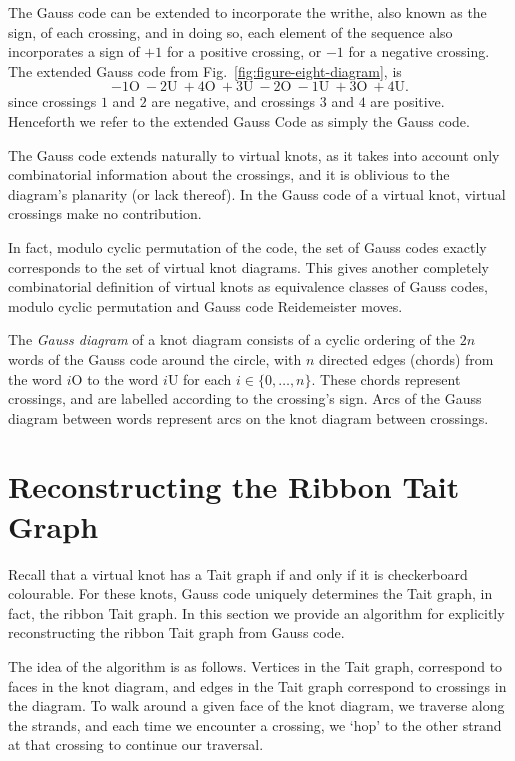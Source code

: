 \documentclass[12pt]{report}
\renewcommand{\over}{\text{O}}
\newcommand{\under}{\text{U}}
\theoremstyle{upright}
\begin{document}
The Gauss code can be extended to incorporate the writhe, also known as the sign, of each crossing, and in doing so, each element of the sequence also incorporates a sign of $+1$ for a positive crossing, or $-1$ for a negative crossing. The extended Gauss code from Fig.~\ref{fig:figure-eight-diagram}, is
\[-1\over\ -2\under\ +4\over\ +3\under\ -2\over\ -1\under\ +3\over\ +4\under.\]
since crossings $1$ and $2$ are negative, and crossings $3$ and $4$ are positive. Henceforth we refer to the extended Gauss Code as simply the Gauss code.

The Gauss code extends naturally to virtual knots, as it takes into account only combinatorial information about the crossings, and it is oblivious to the diagram's planarity (or lack thereof). In the Gauss code of a virtual knot, virtual crossings make no contribution. 

In fact, modulo cyclic permutation of the code, the set of Gauss codes exactly corresponds to the set of virtual knot diagrams. This gives another completely combinatorial definition of virtual knots as equivalence classes of Gauss codes, modulo cyclic permutation and Gauss code Reidemeister moves.

The \textit{Gauss diagram} of a knot diagram consists of a cyclic ordering of the $2n$ words of the Gauss code around the circle, with $n$ directed edges (chords) from the word $i\over$ to the word $i\under$ for each $i \in \{0, \dots, n\}$. These chords represent crossings, and are labelled according to the crossing's sign. Arcs of the Gauss diagram between words represent arcs on the knot diagram between crossings.

\section{Reconstructing the Ribbon Tait Graph}

Recall that a virtual knot has a Tait graph if and only if it is checkerboard colourable. For these knots, Gauss code uniquely determines the Tait graph, in fact, the ribbon Tait graph. In this section we provide an algorithm for explicitly reconstructing the ribbon Tait graph from Gauss code.
	
The idea of the algorithm is as follows. Vertices in the Tait graph, correspond to faces in the knot diagram, and edges in the Tait graph correspond to crossings in the diagram. To walk around a given face of the knot diagram, we traverse along the strands, and each time we encounter a crossing, we `hop' to the other strand at that crossing to continue our traversal.
\end{document}
